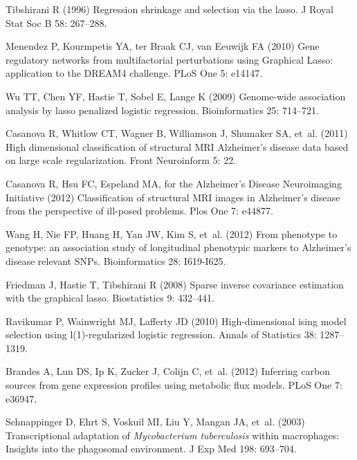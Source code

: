 \documentclass[12pt]{article}
\begin{document}
\begin{thebibliography}{10}
Tibshirani R (1996) Regression shrinkage and selection via the lasso.
\newblock J Royal Stat Soc B 58: 267--288.

Menendez P, Kourmpetis YA, ter Braak CJ, van Eeuwijk FA (2010) Gene regulatory
  networks from multifactorial perturbations using {Graphical Lasso:}
  application to the {DREAM4} challenge.
\newblock PLoS One 5: e14147.

Wu TT, Chen YF, Hastie T, Sobel E, Lange K (2009) Genome-wide association
  analysis by lasso penalized logistic regression.
\newblock Bioinformatics 25: 714--721.

Casanova R, Whitlow CT, Wagner B, Williamson J, Shumaker SA, et~al. (2011) High
  dimensional classification of structural {MRI Alzheimer's} disease data based
  on large scale regularization.
\newblock Front Neuroinform 5: 22.

Casanova R, Hsu FC, Espeland MA, {for the Alzheimer's Disease Neuroimaging
  Initiative} (2012) Classification of structural {MRI} images in {Alzheimer's}
  disease from the perspective of ill-posed problems.
\newblock Plos One 7: e44877.

Wang H, Nie FP, Huang H, Yan JW, Kim S, et~al. (2012) From phenotype to
  genotype: an association study of longitudinal phenotypic markers to
  {Alzheimer's} disease relevant {SNPs}.
\newblock Bioinformatics 28: I619-I625.

Friedman J, Hastie T, Tibshirani R (2008) Sparse inverse covariance estimation
  with the graphical lasso.
\newblock Biostatistics 9: 432--441.

Ravikumar P, Wainwright MJ, Lafferty JD (2010) High-dimensional ising model
  selection using l(1)-regularized logistic regression.
\newblock Annals of Statistics 38: 1287--1319.

Brandes A, Lun DS, Ip K, Zucker J, Colijn C, et~al. (2012) Inferring carbon
  sources from gene expression profiles using metabolic flux models.
\newblock PLoS One 7: e36947.

Schnappinger D, Ehrt S, Voskuil MI, Liu Y, Mangan JA, et~al. (2003)
  Transcriptional adaptation of \emph{Mycobacterium tuberculosis} within
  macrophages: Insights into the phagosomal environment.
\newblock J Exp Med 198: 693--704.


\end{thebibliography}
\end{document}
